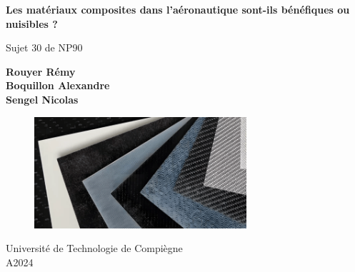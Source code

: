 
\begin{titlepage}
    \begin{center}
        \vspace*{1cm}

        \Huge
        \textbf{Les matériaux composites dans l'aéronautique sont-ils
        bénéfiques ou nuisibles ?}

        \vspace{0.5cm}
        \LARGE
        Sujet 30 de NP90
        \vspace{1.5cm}

        \textbf{Rouyer Rémy \\ Boquillon Alexandre \\ Sengel Nicolas}

        \vfill

        \begin{figure}[h]
            \centering
            \includegraphics[width=0.7\textwidth]{../ressources/images/composite}
        \end{figure}

        \vfill

        \vspace{1cm}
        \Large
        Université de Technologie de Compiègne\\
        A2024\\
        \vspace{1cm}
        


    \end{center}
\end{titlepage}
